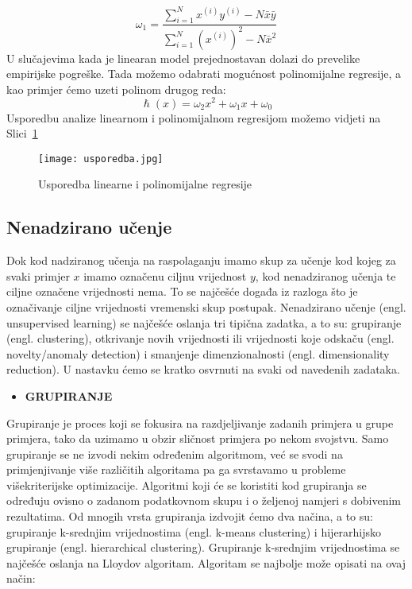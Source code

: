 \documentclass[times, utf8, zavrsni, numeric]{fer}
\begin{document}
\begin{equation}
\omega_1=\frac{\sum_{i=1}^{N} x^{(i)} y^{(i)} - N \bar{x}\bar{y}}{\sum_{i=1}^{N} (x^{(i)})^2 - N \bar{x}^2}
\end{equation}
U slučajevima kada je linearan model prejednostavan dolazi do prevelike empirijske pogreške. Tada možemo odabrati mogućnost polinomijalne regresije, a kao primjer ćemo uzeti polinom drugog reda:
\begin{equation}
\hslash(x)=\omega_2 x^2 + \omega_1 x + \omega_0
\end{equation}
Usporedbu analize linearnom i polinomijalnom regresijom možemo vidjeti na Slici~\ref{fig:usporedba}

\begin{figure}[H]
\centering
\texttt{[image: usporedba.jpg]}
\caption{Usporedba linearne i polinomijalne regresije\cite{skrip}}
\label{fig:usporedba}
\end{figure}

\subsection{Nenadzirano učenje}
Dok kod nadziranog učenja na raspolaganju imamo skup za učenje kod kojeg za svaki primjer $x$ imamo označenu ciljnu vrijednost $y$, kod nenadziranog učenja te ciljne označene vrijednosti nema. To se najčešće događa iz razloga što je označivanje ciljne vrijednosti vremenski skup postupak. Nenadzirano učenje (engl. unsupervised learning) se najčešće oslanja tri tipična zadatka, a to su: grupiranje (engl. clustering), otkrivanje novih vrijednosti ili vrijednosti koje odskaču (engl. novelty/anomaly detection) i smanjenje dimenzionalnosti (engl. dimensionality reduction). U nastavku ćemo se kratko osvrnuti na svaki od navedenih zadataka.

\begin{itemize}
\item \textbf{GRUPIRANJE}
\end{itemize}
Grupiranje je proces koji se fokusira na razdjeljivanje zadanih primjera u grupe primjera, tako da uzimamo u obzir sličnost primjera po nekom svojstvu. Samo grupiranje se ne izvodi nekim određenim algoritmom, već se svodi na primjenjivanje više različitih algoritama pa ga svrstavamo u probleme višekriterijske optimizacije. Algoritmi koji će se koristiti kod grupiranja se određuju ovisno o zadanom podatkovnom skupu i o željenoj namjeri s dobivenim rezultatima. Od mnogih vrsta grupiranja izdvojit ćemo dva načina, a to su: grupiranje k-srednjim vrijednostima (engl. k-means clustering) i hijerarhijsko grupiranje (engl. hierarchical clustering). Grupiranje k-srednjim vrijednostima se najčešće oslanja na Lloydov algoritam. Algoritam se najbolje može opisati na ovaj način\cite{lloyd}:
\end{document}
